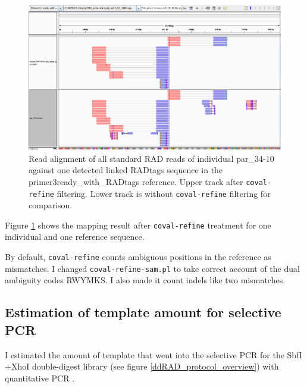 \documentclass[a4paper,12pt,times,print,index,custombib,custommargin]{PhDThesisPSnPDF}\usepackage[]{graphicx}\usepackage[]{color}
\begin{document}
\begin{figure}
\centering
\includegraphics[width=\textwidth]{stampy_par_34-10_vs_primer3ready_after_coval-refine_igv}
\caption{Read alignment of all standard RAD reads of individual par\_34-10 against one detected linked RADtags sequence in the primer3ready\_with\_RADtags reference. Upper track after \texttt{coval-refine} filtering. Lower track is without \texttt{coval-refine} filtering for comparison.}
\label{coval-refine}
\end{figure}

Figure \ref{coval-refine} shows the mapping result after \texttt{coval-refine} treatment for one individual and one reference sequence.

By default, \texttt{coval-refine} counts ambiguous positions in the reference as mismatches. I changed \texttt{coval-refine-sam.pl} to take correct account of the dual ambiguity codes RWYMKS. I also made it count \glspl{indel} like two mismatches.

\FloatBarrier
\subsection{Estimation of template amount for selective PCR}\label{ch:qPCR}

I estimated the amount of template that went into the selective PCR for the SbfI$+$XhoI double-digest library (see figure \ref{ddRAD_protocol_overview}) with quantitative PCR \citep{Rutledge2003}.
\end{document}
